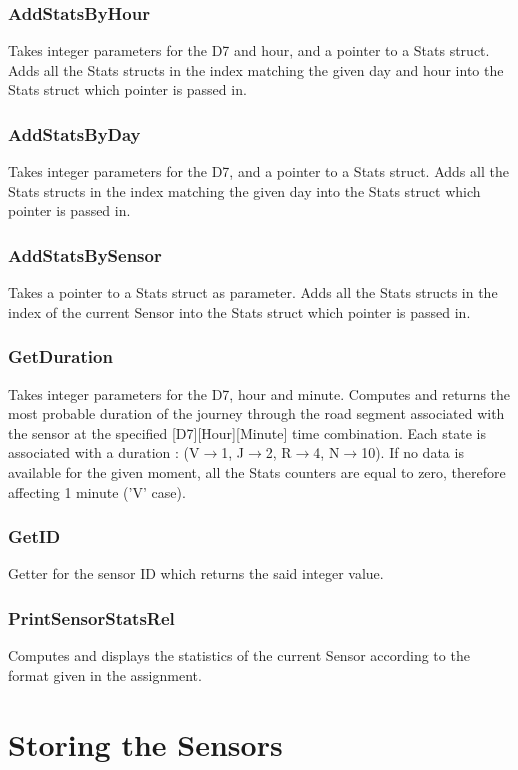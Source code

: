 \documentclass[10pt]{article}
\begin{document}
\subsubsection*{AddStatsByHour}
Takes integer parameters for the D7 and hour\footnotemark[1], and a pointer to a Stats struct. Adds all the Stats structs in the index matching the given day and hour into the Stats struct which pointer is passed in.

\subsubsection*{AddStatsByDay}
Takes integer parameters for the D7\footnotemark[1], and a pointer to a Stats struct. Adds all the Stats structs in the index matching the given day into the Stats struct which pointer is passed in.

\subsubsection*{AddStatsBySensor}
Takes a pointer to a Stats struct as parameter. Adds all the Stats structs in the index of the current Sensor into the Stats struct which pointer is passed in.

\subsubsection*{GetDuration}
Takes integer parameters for the D7, hour and minute\footnotemark[1]. Computes and returns the most probable duration of the journey through the road segment associated with the sensor at the specified [D7][Hour][Minute] time combination. Each state is associated with a duration : (V$\to$1, J$\to$2, R$\to$4, N$\to$10). If no data is available for the given moment, all the Stats counters are equal to zero, therefore affecting 1 minute ('V' case).

\subsubsection*{GetID}
Getter for the sensor ID which returns the said integer value.

\subsubsection*{PrintSensorStatsRel}
Computes and displays the statistics of the current Sensor according to the format given in the assignment.

\section{Storing the Sensors}
\end{document}
